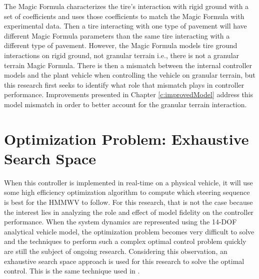 \documentclass[12pt,onecolumn]{report}
\begin{document}
The Magic Formula characterizes the tire's interaction with rigid ground with a set of coefficients and uses those coefficients to match the Magic Formula with experimental data. Then a tire interacting with one type of pavement will have different Magic Formula parameters than the same tire interacting with a different type of pavement. However, the Magic Formula models tire ground interactions on rigid ground, not granular terrain i.e., there is not a granular terrain Magic Formula. There is then a mismatch between the internal controller models and the plant vehicle when controlling the vehicle on granular terrain, but this research first seeks to identify what role that mismatch plays in controller performance. Improvements presented in Chapter \ref{c:improvedModel} address this model mismatch in order to better account for the granular terrain interaction.

\section{Optimization Problem: Exhaustive Search Space}\label{s:Optimization}

When this controller is implemented in real-time on a physical vehicle, it will use some high efficiency optimization algorithm to compute which steering sequence is best for the HMMWV to follow. For this research, that is not the case because the interest lies in analyzing the role and effect of model fidelity on the controller performance. When the system dynamics are represented using the 14-DOF analytical vehicle model, the optimization problem becomes very difficult to solve and the techniques to perform such a complex optimal control problem quickly are still the subject of ongoing research. Considering this observation, an exhaustive search space approach is used for this research to solve the optimal control. This is the same technique used in \cite{ModelFidelity2016}. 
\end{document}
